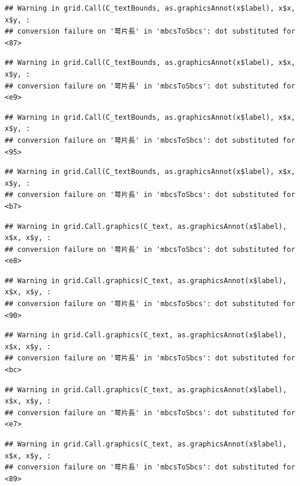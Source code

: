 \documentclass[
]{book}
\begin{document}
\begin{verbatim}
## Warning in grid.Call(C_textBounds, as.graphicsAnnot(x$label), x$x, x$y, :
## conversion failure on '萼片長' in 'mbcsToSbcs': dot substituted for <87>
\end{verbatim}

\begin{verbatim}
## Warning in grid.Call(C_textBounds, as.graphicsAnnot(x$label), x$x, x$y, :
## conversion failure on '萼片長' in 'mbcsToSbcs': dot substituted for <e9>
\end{verbatim}

\begin{verbatim}
## Warning in grid.Call(C_textBounds, as.graphicsAnnot(x$label), x$x, x$y, :
## conversion failure on '萼片長' in 'mbcsToSbcs': dot substituted for <95>
\end{verbatim}

\begin{verbatim}
## Warning in grid.Call(C_textBounds, as.graphicsAnnot(x$label), x$x, x$y, :
## conversion failure on '萼片長' in 'mbcsToSbcs': dot substituted for <b7>
\end{verbatim}

\begin{verbatim}
## Warning in grid.Call.graphics(C_text, as.graphicsAnnot(x$label), x$x, x$y, :
## conversion failure on '萼片長' in 'mbcsToSbcs': dot substituted for <e8>
\end{verbatim}

\begin{verbatim}
## Warning in grid.Call.graphics(C_text, as.graphicsAnnot(x$label), x$x, x$y, :
## conversion failure on '萼片長' in 'mbcsToSbcs': dot substituted for <90>
\end{verbatim}

\begin{verbatim}
## Warning in grid.Call.graphics(C_text, as.graphicsAnnot(x$label), x$x, x$y, :
## conversion failure on '萼片長' in 'mbcsToSbcs': dot substituted for <bc>
\end{verbatim}

\begin{verbatim}
## Warning in grid.Call.graphics(C_text, as.graphicsAnnot(x$label), x$x, x$y, :
## conversion failure on '萼片長' in 'mbcsToSbcs': dot substituted for <e7>
\end{verbatim}

\begin{verbatim}
## Warning in grid.Call.graphics(C_text, as.graphicsAnnot(x$label), x$x, x$y, :
## conversion failure on '萼片長' in 'mbcsToSbcs': dot substituted for <89>
\end{verbatim}
\end{document}
